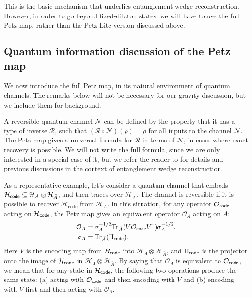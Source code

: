\documentclass[11pt]{article}
\numberwithin{equation}{section}
\def\tr{\text{Tr}}
\begin{document}
This is the basic mechanism that underlies entanglement-wedge reconstruction. However, in order to go beyond fixed-dilaton states, we will have to use the full Petz map, rather than the Petz Lite version discussed above. 


\subsection{Quantum information discussion of the Petz map}\label{sec:qipetz}
{We now introduce the full Petz map, in its natural environment of quantum channels. The remarks below will not be necessary for our gravity discussion, but we include them for background.}

A reversible quantum channel $\mathcal{N}$ can be defined by the property that it has a type of inverse $\mathcal{R}$, such that $(\mathcal{R}\circ \mathcal{N})(\rho) = \rho$ for all inputs to the channel $\mathcal{N}$. The Petz map \cite{petz1986sufficient,petz1988sufficiency,hayden2004structure} gives a universal formula for $\mathcal{R}$ in terms of $\mathcal{N}$, in cases where exact recovery is possible. We will not write the full formula, since we are only interested in a special case of it, but we refer the reader to  \cite{cotler2019entanglement,chen2019entanglement} for details and previous discussions in the context of entanglement wedge reconstruction.

As a representative example, let's consider a quantum channel that embeds $\mathcal{H}_{\sf code} \subseteq \mathcal{H}_{A} \otimes \mathcal{H}_{\bar A}$, and then traces over $\mathcal{H}_{\bar A}$. The channel is reversible if it is possible to recover $\mathcal{H}_{\text{code}}$ from $\mathcal{H}_A$. In this situation, for any operator $\mathcal{O}_{\sf code}$ acting on $\mathcal{H}_{\sf code}$, the Petz map gives an equivalent operator $\mathcal{O}_A$ acting on $A$:
\begin{align}
\mathcal{O}_A &= \sigma_A^{-1/2} \tr_{\bar A}(V \mathcal{O}_{\sf code}V^\dag)\sigma_A^{-1/2}.\label{petzQI}\\
\sigma_A &= \tr_{\bar A}(\Pi_{\sf code}).
\end{align}
Here $V$ is the encoding map from $H_{\sf code}$ into $\mathcal{H}_A\otimes \mathcal{H}_{\bar A}$, and $\Pi_{\sf code}$ is the projector onto the image of $\mathcal{H}_{\sf code}$ in $\mathcal{H}_{A}\otimes \mathcal{H}_{\bar A}$. By saying that $\mathcal{O}_A$ is equivalent to $\mathcal{O}_{\sf code}$, we mean that for any state in $\mathcal{H}_{\sf code}$, the following two operations produce the same state: (a) acting with $\mathcal{O}_{\sf code}$ and then encoding with $V$ and (b) encoding with $V$ first and then acting with $\mathcal{O}_A$.
\end{document}
